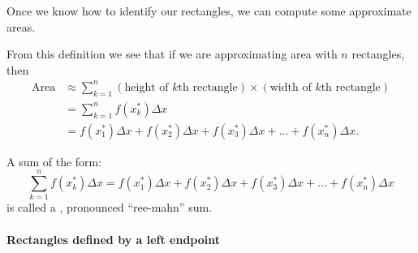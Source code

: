 \documentclass{ximera}
\begin{document}
Once we know how to identify our rectangles, we can compute some
approximate areas.


From this definition we see that if we are approximating area with $n$ rectangles, then 
\begin{align*}
  \text{Area} &\approx \sum_{k=1}^n (\text{height of $k$th rectangle})\times(\text{width of $k$th rectangle}) \\
  &=\sum_{k=1}^n  f(x_k^*)\Delta x \\
  &=  f(x_1^*)\Delta x +  f(x_2^*)\Delta x +   f(x_3^*)\Delta x + \dots +   f(x_n^*)\Delta x. 
\end{align*}


\begin{definition}
  A sum of the form:
  \[
  \sum_{k=1}^n  f(x_k^*)\Delta x  = f(x_1^*)\Delta x +  f(x_2^*)\Delta x +   f(x_3^*)\Delta x + \dots +   f(x_n^*)\Delta x
  \]
  is called a , pronounced ``ree-mahn'' sum.
\end{definition}



\paragraph{Rectangles defined by a left endpoint}

\begin{image}
\end{image}
\end{document}
